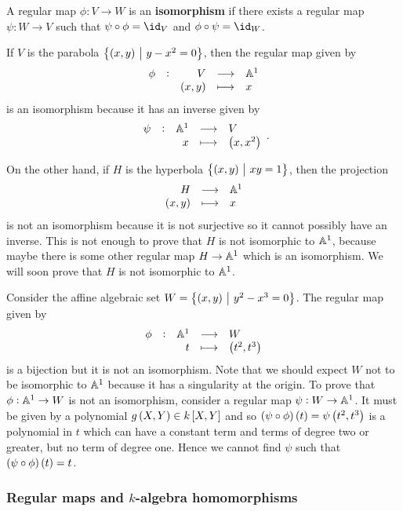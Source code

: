 
\begin{definition*}
A regular map $ \phi : V \to W $ is an \textbf{isomorphism} if there exists a regular map $ \psi : W \to V $ such that $ \psi \circ \phi = \id_V $ and $ \phi \circ \psi = \id_W $.
\end{definition*}

\begin{example*}
If $ V $ is the parabola $ \cbr{\br{x, y} \st y - x^2 = 0} $, then the regular map given by
$$ \function[\phi]{V}{\AA^1}{\br{x, y}}{x} $$
is an isomorphism because it has an inverse given by
$$ \function[\psi]{\AA^1}{V}{x}{\br{x, x^2}}. $$
\end{example*}

\pagebreak

\begin{example*}
On the other hand, if $ H $ is the hyperbola $ \cbr{\br{x, y} \st xy = 1} $, then the projection
$$ \function{H}{\AA^1}{\br{x, y}}{x} $$
is not an isomorphism because it is not surjective so it cannot possibly have an inverse. This is not enough to prove that $ H $ is not isomorphic to $ \AA^1 $, because maybe there is some other regular map $ H \to \AA^1 $ which is an isomorphism. We will soon prove that $ H $ is not isomorphic to $ \AA^1 $.
\end{example*}

\begin{example*}
Consider the affine algebraic set $ W = \cbr{\br{x, y} \st y^2 - x^3 = 0} $. The regular map given by
$$ \function[\phi]{\AA^1}{W}{t}{\br{t^2, t^3}} $$
is a bijection but it is not an isomorphism. Note that we should expect $ W $ not to be isomorphic to $ \AA^1 $ because it has a singularity at the origin. To prove that $ \phi : \AA^1 \to W $ is not an isomorphism, consider a regular map $ \psi : W \to \AA^1 $. It must be given by a polynomial $ g\br{X, Y} \in k\sbr{X, Y} $ and so $ \br{\psi \circ \phi}\br{t} = \psi\br{t^2, t^3} $ is a polynomial in $ t $ which can have a constant term and terms of degree two or greater, but no term of degree one. Hence we cannot find $ \psi $ such that $ \br{\psi \circ \phi}\br{t} = t $.
\end{example*}

\subsubsection{Regular maps and \texorpdfstring{$ k $}{k}-algebra homomorphisms}


